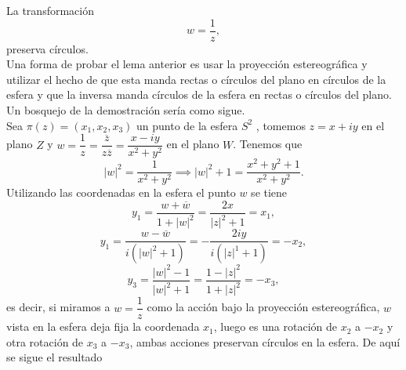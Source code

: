 \begin{lema}\label{lema1}
	La transformación
	$$w=\dfrac{1}{z},$$
	preserva círculos.\\
Una forma de probar el lema anterior es usar la proyección estereográfica y utilizar el hecho de que esta manda rectas o círculos del plano en círculos de la esfera y
que la inversa manda círculos de la esfera en rectas o círculos del plano. Un bosquejo de la demostración sería como sigue.\\
Sea $\pi(z)=(x_1,x_2,x_3)$ un punto de la esfera $S^2$ , tomemos $z=x+iy$ en el plano $Z$ y $w=\dfrac{1}{z}=\dfrac{\overline{z}}{z\overline{z}}=\dfrac{x-iy}{x^2+y^2}$ en el plano $W$. Tenemos que 
$$|w|^2=\dfrac{1}{x^2+y^2}\implies |w|^2+1=\dfrac{x^2+y^2+1}{x^2+y^2}.$$
Utilizando las coordenadas en la esfera el punto $w$ se tiene 
$$y_1=\dfrac{w+\overline{w}}{1+|w|^2}=\dfrac{2x}{|z|^2+1}=x_1,$$
$$y_1=\dfrac{w-\overline{w}}{i(|w|^2+1)}=-\dfrac{2iy}{i(|z|^1+1)}=-x_2,$$
$$y_3=\dfrac{|w|^2-1}{|w|^2+1}=\dfrac{1-|z|^2}{1+|z|^2}=-x_3,$$
es decir, si miramos a $w=\dfrac{1}{z}$ como la acción bajo la proyección estereográfica, $w$ vista en la esfera deja fija la coordenada $x_1$, luego es una rotación de $x_2$ a $-x_2$ y otra rotación  de $x_3$ a $-x_3$, ambas acciones preservan círculos en la esfera. De aquí se sigue el resultado
\end{lema}

